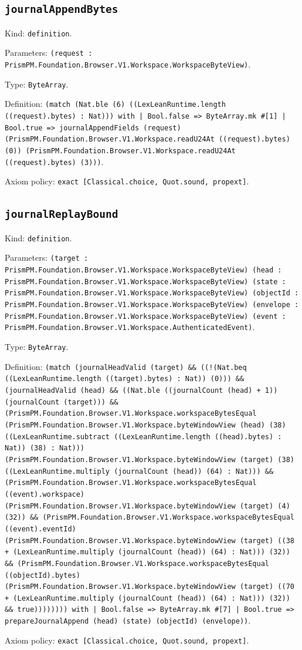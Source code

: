 \documentclass[11pt]{article}
\begin{document}
\subsection*{\texttt{journalAppendBytes}}
\noindent Kind: \texttt{definition}.\par
\noindent Parameters: \texttt{(request : PrismPM.Foundation.Browser.V1.Workspace.WorkspaceByteView)}.\par
\noindent Type: \texttt{ByteArray}.\par
\noindent Definition: \texttt{(match (Nat.ble (6) ((LexLeanRuntime.length ((request).bytes) : Nat))) with | Bool.false => ByteArray.mk \#[1] | Bool.true => journalAppendFields (request) (PrismPM.Foundation.Browser.V1.Workspace.readU24At ((request).bytes) (0)) (PrismPM.Foundation.Browser.V1.Workspace.readU24At ((request).bytes) (3)))}.\par
\noindent Axiom policy: \texttt{exact [Classical.choice, Quot.sound, propext]}.\par
\subsection*{\texttt{journalReplayBound}}
\noindent Kind: \texttt{definition}.\par
\noindent Parameters: \texttt{(target : PrismPM.Foundation.Browser.V1.Workspace.WorkspaceByteView) (head : PrismPM.Foundation.Browser.V1.Workspace.WorkspaceByteView) (state : PrismPM.Foundation.Browser.V1.Workspace.WorkspaceByteView) (objectId : PrismPM.Foundation.Browser.V1.Workspace.WorkspaceByteView) (envelope : PrismPM.Foundation.Browser.V1.Workspace.WorkspaceByteView) (event : PrismPM.Foundation.Browser.V1.Workspace.AuthenticatedEvent)}.\par
\noindent Type: \texttt{ByteArray}.\par
\noindent Definition: \texttt{(match (journalHeadValid (target) \&\& ((!(Nat.beq ((LexLeanRuntime.length ((target).bytes) : Nat)) (0))) \&\& (journalHeadValid (head) \&\& ((Nat.ble ((journalCount (head) + 1)) (journalCount (target))) \&\& (PrismPM.Foundation.Browser.V1.Workspace.workspaceBytesEqual (PrismPM.Foundation.Browser.V1.Workspace.byteWindowView (head) (38) ((LexLeanRuntime.subtract ((LexLeanRuntime.length ((head).bytes) : Nat)) (38) : Nat))) (PrismPM.Foundation.Browser.V1.Workspace.byteWindowView (target) (38) ((LexLeanRuntime.multiply (journalCount (head)) (64) : Nat))) \&\& (PrismPM.Foundation.Browser.V1.Workspace.workspaceBytesEqual ((event).workspace) (PrismPM.Foundation.Browser.V1.Workspace.byteWindowView (target) (4) (32)) \&\& (PrismPM.Foundation.Browser.V1.Workspace.workspaceBytesEqual ((event).eventId) (PrismPM.Foundation.Browser.V1.Workspace.byteWindowView (target) ((38 + (LexLeanRuntime.multiply (journalCount (head)) (64) : Nat))) (32)) \&\& (PrismPM.Foundation.Browser.V1.Workspace.workspaceBytesEqual ((objectId).bytes) (PrismPM.Foundation.Browser.V1.Workspace.byteWindowView (target) ((70 + (LexLeanRuntime.multiply (journalCount (head)) (64) : Nat))) (32)) \&\& true)))))))) with | Bool.false => ByteArray.mk \#[7] | Bool.true => prepareJournalAppend (head) (state) (objectId) (envelope))}.\par
\noindent Axiom policy: \texttt{exact [Classical.choice, Quot.sound, propext]}.\par
\end{document}
